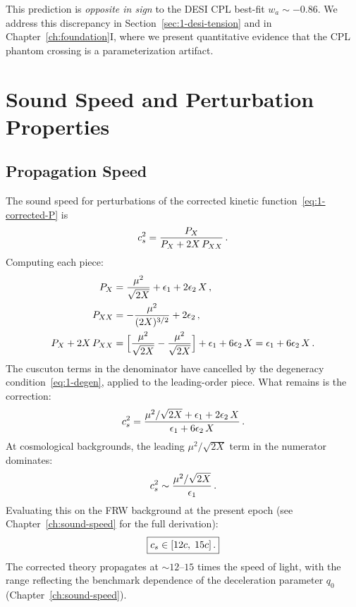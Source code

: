 This prediction is \emph{opposite in sign} to the DESI CPL best-fit $w_a \sim -0.86$. We address this discrepancy in Section~\ref{sec:1-desi-tension} and in Chapter~\ref{ch:foundation}I, where we present quantitative evidence that the CPL phantom crossing is a parameterization artifact.


\section{Sound Speed and Perturbation Properties}
\label{sec:1-sound}

\subsection{Propagation Speed}
\label{sec:1-propagation}

The sound speed for perturbations of the corrected kinetic function~\eqref{eq:1-corrected-P} is
\begin{equation}
\label{eq:1-cs-def}
c_s^2 = \frac{P_X}{P_X + 2X\,P_{XX}}\,.
\end{equation}
Computing each piece:
\begin{align}
P_X &= \frac{\mu^2}{\sqrt{2X}} + \epsilon_1 + 2\epsilon_2\, X\,, \label{eq:1-PX-corrected}\\
P_{XX} &= -\frac{\mu^2}{(2X)^{3/2}} + 2\epsilon_2\,, \label{eq:1-PXX-corrected}\\
P_X + 2X\,P_{XX} &= \Bigl[\frac{\mu^2}{\sqrt{2X}} - \frac{\mu^2}{\sqrt{2X}}\Bigr] + \epsilon_1 + 6\epsilon_2\, X = \epsilon_1 + 6\epsilon_2\, X\,. \label{eq:1-denominator}
\end{align}
The cuscuton terms in the denominator have cancelled by the degeneracy condition~\eqref{eq:1-degen}, applied to the leading-order piece. What remains is the correction:
\begin{equation}
\label{eq:1-cs-full}
c_s^2 = \frac{\mu^2/\sqrt{2X} + \epsilon_1 + 2\epsilon_2\, X}{\epsilon_1 + 6\epsilon_2\, X}\,.
\end{equation}
At cosmological backgrounds, the leading $\mu^2/\sqrt{2X}$ term in the numerator dominates:
\begin{equation}
\label{eq:1-cs-approx}
c_s^2 \sim \frac{\mu^2/\sqrt{2X}}{\epsilon_1}\,.
\end{equation}
Evaluating this on the FRW background at the present epoch (see Chapter~\ref{ch:sound-speed} for the full derivation):
\begin{equation}
\label{eq:1-cs-value}
\boxed{c_s \in [12c,\; 15c]\,.}
\end{equation}
The corrected theory propagates at ${\sim}12$--$15$ times the speed of light, with the range reflecting the benchmark dependence of the deceleration parameter $q_0$ (Chapter~\ref{ch:sound-speed}).

